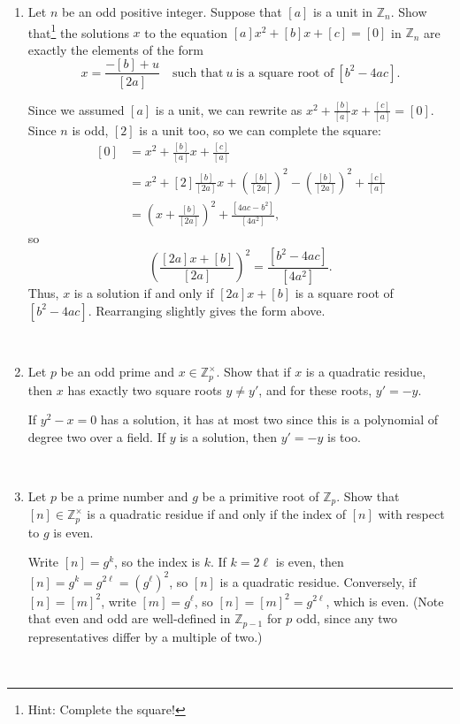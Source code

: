 \documentclass[12pt]{amsart}
\newcommand{\Z}{\mathbb{Z}}
\newcommand{\solution}[1]{\ifthenelse {\equal{\displaysol}{1}} {\begin{framed}{\color{meretale}\noindent #1}\end{framed}} { \ }}
\begin{document}
\begin{enumerate}
\item Let $n$ be an odd positive integer. Suppose that $[a]$ is a unit in $\Z_n$. Show that\footnote{Hint: Complete the square!} the solutions $x$ to the equation $ [a] x^2 + [b] x + [c] = [0]$ in $\Z_n$ are exactly the elements of the form
\[ x=\frac{-[b] + u}{[2a]} \quad \text{such that} \ u \ \text{is a square root of} \ [b^2-4ac]. \]


\solution{Since we assumed $[a]$ is a unit, we can rewrite as $x^2 + \frac{[b]}{[a]} x + \frac{[c]}{[a]} = [0]$. Since $n$ is odd, $[2]$ is a unit too, so we can complete the square:
\[\begin{aligned}  [0] &= x^2 + \frac{[b]}{[a]} x + \frac{[c]}{[a]} \\
&= x^2 + [2] \frac{[b]}{[2a]} x + \left(\frac{[b]}{[2a]} \right)^2 -  \left(\frac{[b]}{[2a]} \right)^2 + \frac{[c]}{[a]} \\
&= \left(x+  \frac{[b]}{[2a]} \right)^2  +  \frac{[4ac- b^2]}{[4a^2]},
\end{aligned}\]
so
\[ \left(\frac{[2a] x+ [b]}{[2a]} \right)^2 = \frac{[b^2-4ac]}{[4a^2]}.\]
Thus, $x$ is a solution if and only if $[2a]x + [b]$ is a square root of $[b^2-4ac]$. Rearranging slightly gives the form above.
}



\item Let $p$ be an odd prime and $x \in \Z_p^\times$. Show that if $x$ is a quadratic residue, then $x$ has exactly two square roots $y\neq y'$, and for these roots, $y'=-y$.

\solution{If $y^2 - x = 0$ has a solution, it has at most two since this is a polynomial of degree two over a field. If $y$ is a solution, then $y'=-y$ is too.}

\item\label{indexres} Let $p$ be a prime number and $g$ be a primitive root of $\Z_p$. Show that $[n]\in \Z_p^\times$ is a quadratic residue if and only if the index of $[n]$ with respect to $g$ is even.

\solution{Write $[n] = g^k$, so the index is $k$. If $k=2\ell$ is even, then $[n] = g^k = g^{2\ell} = (g^{\ell})^2$, so $[n]$ is a quadratic residue. Conversely, if $[n]= [m]^2$, write $[m] = g^\ell$, so $[n]=[m]^2 = g^{2 \ell}$, which is even. (Note that even and odd are well-defined in $\Z_{p-1}$ for $p$ odd, since any two representatives differ by a multiple of two.)}

\end{enumerate}
\end{document}
